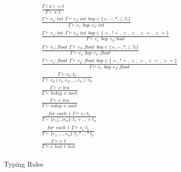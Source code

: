 \begin{figure}[ht!]
\begin{align*}
  \tag{T-VARIABLE}
  &\frac
  {\Gamma(x)=t}
  {\Gamma \vdash x:t}\\
  \tag{T-INT ARITH}
  &\frac
  {\Gamma \vdash e_1:int ~~ \Gamma \vdash e_2:int ~~ bop \in \{+,-,*,/,\%\}}
  {\Gamma \vdash e_1 ~~ bop ~~ e_2 :int} \\
  \tag{T-INT REL}
  &\frac
  {\Gamma \vdash e_1:int ~~ \Gamma \vdash e_2:int ~~ bop \in \{=, !=, <, >, <=, >=\}}
  {\Gamma \vdash e_1 ~~ bop ~~ e_2 :bool} \\
  \tag{T-FLOAT ARITH}
  &\frac
  {\Gamma \vdash e_1:float ~~ \Gamma \vdash e_2:float ~~ bop \in \{+,-,*,/,\%\}}
  {\Gamma \vdash e_1 ~~ bop ~~ e_2 :float}\\
  \tag{T-FLOAT REL}
  &\frac
  {\Gamma \vdash e_1:float ~~ \Gamma \vdash e_2:float ~~ bop \in \{=, !=, <, >, <=, >=\}}
  {\Gamma \vdash e_1 ~~ bop ~~ e_2 :float}\\
  \tag{T-CONSTRAINT}
  &\frac
  {\Gamma \vdash e_0:t_0}
  {\Gamma \vdash e_0(e_1, e_2, ..., e_n):t_0}\\
  \tag{T-HSKIP}
  &\frac
  {\Gamma \vdash e:len}
  {\Gamma \vdash hskip ~~ e:unit}\\
  \tag{T-VSKIP}
  &\frac
  {\Gamma \vdash e:len}
  {\Gamma \vdash vskip ~~ e:unit}\\
  \tag{T-UNION}
  &\frac
  {for ~~ each ~~ i ~~ \Gamma \vdash e_i:t_i }
  {\Gamma \vdash \{e_1|...|e_n\}:t_1+...+t_n}\\
  \tag{T-STRUCT}
  &\frac
  {for ~~ each ~~ i ~~ \Gamma \vdash e_i:t_i }
  {\Gamma \vdash \{e_1, ..., e_n\}:t_1*...*t_n}\\
  \tag{T-LIST}
  &\frac
  {\Gamma \vdash e:t}
  {\Gamma \vdash e~~list:t~~list}\\
\end{align*}
\caption{Typing Rules}\label{fig:typingrule}
\end{figure}
